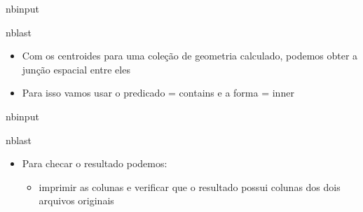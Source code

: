 \documentclass[letterpaper,10pt,brazil]{sphinxmanual}
\begin{document}
\begin{sphinxuseclass}{nbinput}
\begin{sphinxuseclass}{nblast}
{
\begin{sphinxVerbatim}[commandchars=\\\{\}]
\llap{\color{nbsphinxin}[2]:\,\hspace{\fboxrule}\hspace{\fboxsep}}\PYG{p}{[}\PYG{p}{]}  \PYG{p}{[}\PYG{p}{]}
\end{sphinxVerbatim}
}

\end{sphinxuseclass}
\end{sphinxuseclass}\begin{itemize}
\item {} 
\sphinxAtStartPar
Com os centroides para uma coleção de geometria calculado, podemos obter a junção espacial entre eles

\item {} 
\sphinxAtStartPar
Para isso vamos usar o predicado = contains e a forma = inner

\end{itemize}

\begin{sphinxuseclass}{nbinput}
\begin{sphinxuseclass}{nblast}
{
\begin{sphinxVerbatim}[commandchars=\\\{\}]
\llap{\color{nbsphinxin}[4]:\,\hspace{\fboxrule}\hspace{\fboxsep}}     
\end{sphinxVerbatim}
}

\end{sphinxuseclass}
\end{sphinxuseclass}\begin{itemize}
\item {} 
\sphinxAtStartPar
Para checar o resultado podemos:
\begin{itemize}
\item {} 
\sphinxAtStartPar
imprimir as colunas e verificar que o resultado possui colunas dos dois arquivos originais

\end{itemize}

\end{itemize}
\end{document}
